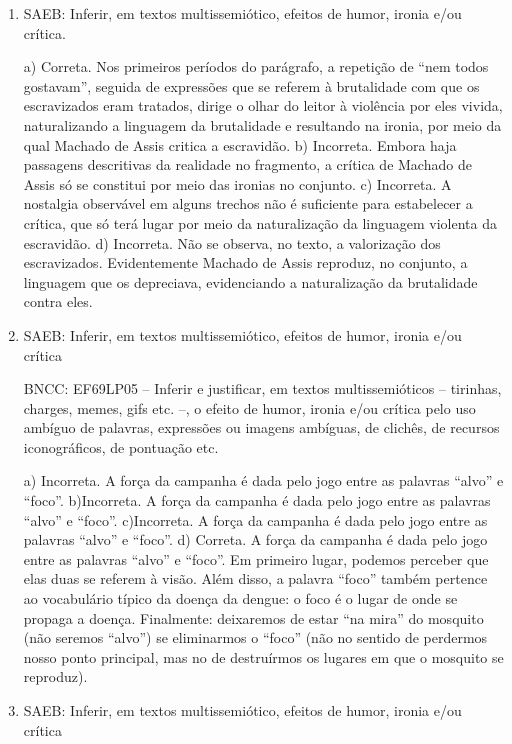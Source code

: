 \begin{enumerate}

\item
SAEB: Inferir, em textos multissemiótico, efeitos de humor, ironia e/ou
crítica.

a) Correta. Nos primeiros períodos do parágrafo, a repetição de 
``nem todos gostavam'', seguida de expressões que se referem à brutalidade
com que os escravizados eram tratados, dirige o olhar do leitor à violência
por eles vivida, naturalizando a linguagem da brutalidade e resultando na 
ironia, por meio da qual Machado de Assis critica a escravidão.
b) Incorreta. Embora haja passagens descritivas da realidade no fragmento, 
a crítica de Machado de Assis só se constitui por meio das ironias no conjunto. 
c) Incorreta. A nostalgia observável em alguns trechos não é suficiente para
estabelecer a crítica, que só terá lugar por meio da naturalização da linguagem
violenta da escravidão. 
d) Incorreta. Não se observa, no texto, a valorização dos escravizados. Evidentemente
Machado de Assis reproduz, no conjunto, a linguagem que os depreciava, evidenciando
a naturalização da brutalidade contra eles.

\item
SAEB: Inferir, em textos multissemiótico, efeitos de humor, ironia e/ou
crítica

BNCC: EF69LP05 -- Inferir e justificar, em textos multissemióticos --
tirinhas, charges, memes, gifs etc. --, o efeito de humor, ironia e/ou
crítica pelo uso ambíguo de palavras, expressões ou imagens ambíguas, de
clichês, de recursos iconográficos, de pontuação etc.

a) Incorreta. A força da campanha é dada pelo jogo entre as palavras
``alvo'' e ``foco''.
b)Incorreta. A força da campanha é dada pelo jogo entre as palavras
``alvo'' e ``foco''.
c)Incorreta. A força da campanha é dada pelo jogo entre as palavras
``alvo'' e ``foco''.
d) Correta. A força da campanha é dada pelo jogo entre as palavras
``alvo'' e ``foco''. Em primeiro lugar, podemos perceber que elas duas
se referem à visão. Além disso, a palavra ``foco'' também pertence ao 
vocabulário típico da doença da dengue: o foco é o lugar de onde se propaga a doença. 
Finalmente: deixaremos de estar ``na mira'' do mosquito (não seremos ``alvo'')
se eliminarmos o ``foco'' (não no sentido de perdermos nosso ponto principal, mas no de
destruírmos os lugares em que o mosquito se reproduz). 

\item
SAEB: Inferir, em textos multissemiótico, efeitos de humor, ironia e/ou
crítica


\end{enumerate}
